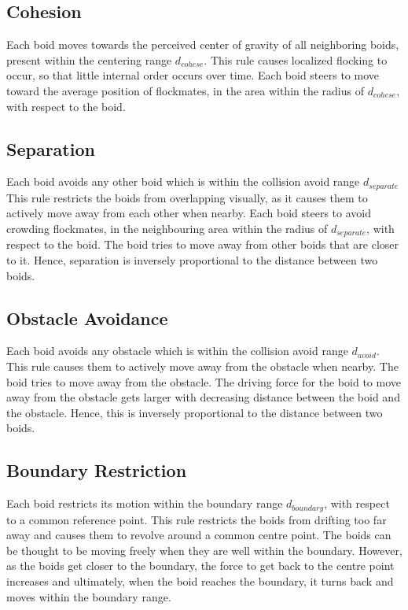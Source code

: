 \documentclass[12pt]{report}
\begin{document}
\subsection*{Cohesion}
Each boid moves towards the perceived center of gravity of all neighboring boids, present within the centering range $d_{cohese}$. This rule causes localized flocking to occur, so that little internal order occurs over time. Each boid steers to move toward the average position of flockmates, in the area within the radius of $d_{cohese}$, with respect to the boid. 

\subsection*{Separation}
Each boid avoids any other boid which is within the collision avoid range $d_{separate}$ This rule restricts the boids from overlapping visually, as it causes them to actively move away from each other when nearby. Each boid steers to avoid crowding flockmates, in the neighbouring area within the radius of $d_{separate}$, with respect to the boid. 
\newline
The boid tries to move away from other boids that are closer to it. Hence, separation is inversely proportional to the distance between two boids.

\subsection*{Obstacle Avoidance}
Each boid avoids any obstacle which is within the collision avoid range $d_{avoid}$. This rule causes them to actively move away from the obstacle when nearby.  
\newline  
The boid tries to move away from the obstacle. The driving force for the boid to move away from the obstacle gets larger with decreasing distance between the boid and the obstacle. Hence, this is inversely proportional to the distance between two boids.

\subsection*{Boundary Restriction}
Each boid restricts its motion within the boundary range $d_{boundary}$, with respect to a common reference point. This rule restricts the boids from drifting too far away and causes them to revolve around a common centre point.
\newline  
The boids can be thought to be moving freely when they are well within the boundary. However, as the boids get closer to the boundary, the force to get back to the centre point increases and ultimately, when the boid reaches the boundary, it turns back and moves within the boundary range.
\end{document}
